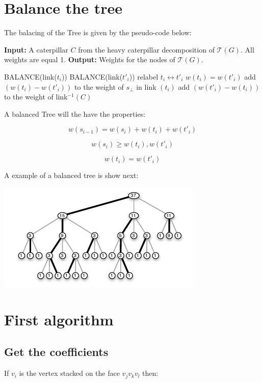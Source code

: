\documentclass[10pt,a4paper]{article}
\newcommand{\Tau}{\mathcal{T}}
\begin{document}
\section{Balance the tree}


The balacing of the Tree is given by the pseudo-code below:

\begin{algorithmic}
\State \textbf{Input:} A caterpillar $C$ from the heavy caterpillar decomposition of $\Tau(G)$. All weights are equal 1.
\State \textbf{Output:} Weights for the nodes of $\Tau(G)$.

	\State BALANCE(link($t_i$))
	\State BALANCE(link($t'_i$))
        \State relabel $t_i \leftrightarrow t'_i$
    \EndIf
	\State $w(t_i)=w(t'_i)$
	\State add $(w(t_i ) - w(t'_i ))$ to the weight of $s_{\bot}$ in link $(t_i)$
	\State add $(w(t'_i ) - w(t_i ))$ to the weight of link$^{-1} (C)$
\EndFor
\EndFunction
\end{algorithmic}


A balanced Tree will the have the properties:

$$w(s_{i-1})= w(s_i) + w(t_i) + w(t'_i)$$

$$w(s_i)\geq w(t_i),w(t'_i) $$

$$w(t_i)= w(t'_i) $$

A example of a balanced tree is show next: 

\includegraphics[scale=1]{balancedTree.png} 


\section{First algorithm}

\subsection{Get the coefficients}

If $v_i$ is the vertex stacked on the face $v_jv_kv_l$ then:
\end{document}
